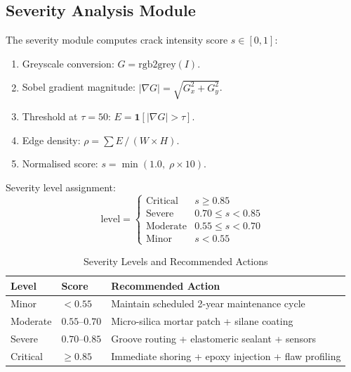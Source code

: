 \documentclass[conference]{IEEEtran}
\begin{document}
\subsection{Severity Analysis Module}

The severity module computes crack intensity score $s \in [0,1]$:
\begin{enumerate}[leftmargin=*, label=\arabic*)]
  \item Greyscale conversion: $G = \mathrm{rgb2grey}(I)$.
  \item Sobel gradient magnitude: $|\nabla G| = \sqrt{G_x^2 + G_y^2}$.
  \item Threshold at $\tau=50$: $E = \mathbf{1}[|\nabla G|>\tau]$.
  \item Edge density: $\rho = \sum E\,/\,(W \times H)$.
  \item Normalised score: $s = \min(1.0,\;\rho \times 10)$.
\end{enumerate}
Severity level assignment:
\begin{equation}
  \mathrm{level} =
  \begin{cases}
    \text{Critical}  & s \geq 0.85 \\
    \text{Severe}    & 0.70 \leq s < 0.85 \\
    \text{Moderate}  & 0.55 \leq s < 0.70 \\
    \text{Minor}     & s < 0.55
  \end{cases}
\end{equation}

\begin{table}[H]
  \caption{Severity Levels and Recommended Actions}
  \label{tab:severity}
  \centering
  \renewcommand{\arraystretch}{1.2}
  \begin{tabular}{p{1.0cm} p{1.0cm} p{5.2cm}}
    \toprule
    \textbf{Level} & \textbf{Score} & \textbf{Recommended Action} \\
    \midrule
    Minor    & $<\!0.55$       & Maintain scheduled 2-year maintenance cycle \\
    Moderate & $0.55$--$0.70$  & Micro-silica mortar patch + silane coating \\
    Severe   & $0.70$--$0.85$  & Groove routing + elastomeric sealant + sensors \\
    Critical & $\geq\!0.85$    & Immediate shoring + epoxy injection + flaw profiling \\
    \bottomrule
  \end{tabular}
\end{table}
\end{document}
